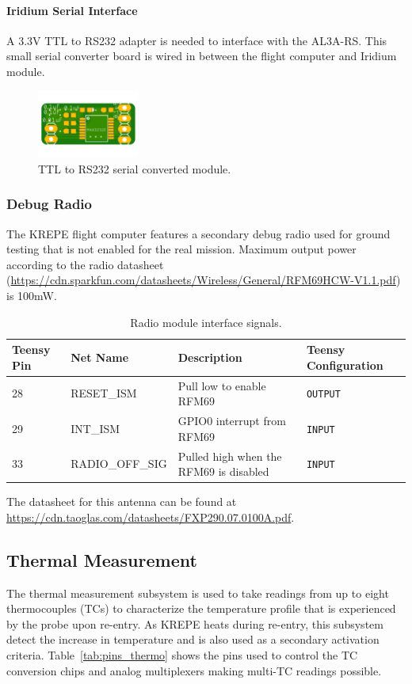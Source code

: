 \documentclass{article}
\begin{document}
\paragraph{Iridium Serial Interface}

A 3.3V TTL to RS232 adapter is needed to interface with the AL3A-RS. This small serial converter board is wired in between the flight computer and Iridium module.

\begin{figure}[H]
	\centering
	\includegraphics[width=0.3\textwidth]{images/serial-converter.png}
	\caption{TTL to RS232 serial converted module.}
	\label{fig:iridium-rf-specs}
\end{figure}



\subsubsection{Debug Radio}
The KREPE flight computer features a secondary debug radio used for ground testing that is not enabled for the real mission.  Maximum output power according to the radio datasheet (\url{https://cdn.sparkfun.com/datasheets/Wireless/General/RFM69HCW-V1.1.pdf}) is 100mW.
\begin{table}[H]
	\centering
	\caption{Radio module interface signals.}
	\label{tab:pins_radio}
	\begin{tabular}{l|l|l|l}
		Teensy Pin & Net Name  & Description   & Teensy Configuration \\
		\hline 
		28 & RESET\_ISM  &  Pull low to enable RFM69   & \texttt{OUTPUT} \\
		29 & INT\_ISM    &  GPIO0 interrupt from RFM69 & \texttt{INPUT} \\
		33 & RADIO\_OFF\_SIG & Pulled high when the RFM69 is disabled & \texttt{INPUT} \\
	\end{tabular}
\end{table}
The datasheet for this antenna can be found at  \url{https://cdn.taoglas.com/datasheets/FXP290.07.0100A.pdf}. 
  


\subsection{Thermal Measurement}
The thermal measurement subsystem is used to take readings from up to eight thermocouples (TCs) to characterize the temperature profile that is experienced by the probe upon re-entry. As KREPE heats during re-entry, this subsystem detect the increase in temperature and is also used as a secondary activation criteria. Table~\ref{tab:pins_thermo} shows the pins used to control the TC conversion chips and analog multiplexers making multi-TC readings possible.
\end{document}
